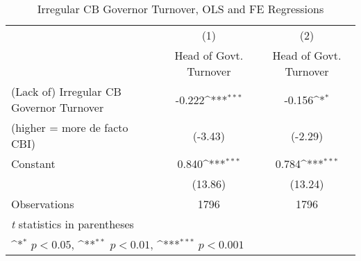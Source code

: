 \begin{table}[htbp]\centering
\def\sym#1{\ifmmode^{#1}\else\(^{#1}\)\fi}
\caption{Irregular CB Governor Turnover, OLS and FE Regressions \label{irregtdHOGalone}}
\begin{tabular}{l*{2}{c}}
\toprule
                                        &\multicolumn{1}{c}{(1)}&\multicolumn{1}{c}{(2)}\\
                                        &\multicolumn{1}{c}{Head of Govt. Turnover}&\multicolumn{1}{c}{Head of Govt. Turnover}\\
\midrule
(Lack of) Irregular CB Governor Turnover&   -0.222\sym{***}&   -0.156\sym{*}  \\
(higher = more de facto CBI)            &  (-3.43)         &  (-2.29)         \\
\addlinespace
Constant                                &    0.840\sym{***}&    0.784\sym{***}\\
                                        &  (13.86)         &  (13.24)         \\
\midrule
Observations                            &     1796         &     1796         \\
\bottomrule
\multicolumn{3}{l}{\footnotesize \textit{t} statistics in parentheses}\\
\multicolumn{3}{l}{\footnotesize \sym{*} \(p<0.05\), \sym{**} \(p<0.01\), \sym{***} \(p<0.001\)}\\
\end{tabular}
\end{table}
